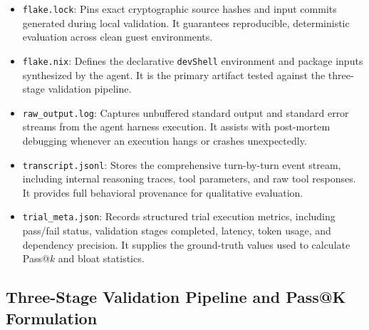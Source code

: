 \begin{itemize}
	\item \texttt{flake.lock}: Pins exact cryptographic source hashes and input commits
	      generated during local validation. It guarantees reproducible, deterministic
	      evaluation across clean guest environments.

	\item \texttt{flake.nix}: Defines the declarative \texttt{devShell}
	      environment and package inputs synthesized by the agent. It is the primary
	      artifact tested against the three-stage validation pipeline.

	\item \texttt{raw\_output.log}: Captures unbuffered standard output and standard
	      error streams from the agent harness execution. It assists with post-mortem
	      debugging whenever an execution hangs or crashes unexpectedly.

	\item \texttt{transcript.jsonl}: Stores the comprehensive turn-by-turn event stream,
	      including internal reasoning traces, tool parameters, and raw tool
	      responses. It provides full behavioral provenance for qualitative evaluation.

	\item \texttt{trial\_meta.json}: Records structured trial execution metrics,
	      including pass/fail status, validation stages completed, latency, token usage,
	      and dependency precision. It supplies the ground-truth values used to calculate
	      Pass@$k$ and bloat statistics.
\end{itemize}

\subsection{Three-Stage Validation Pipeline and Pass@K Formulation}
\label{subsec:pass-k-metric}

